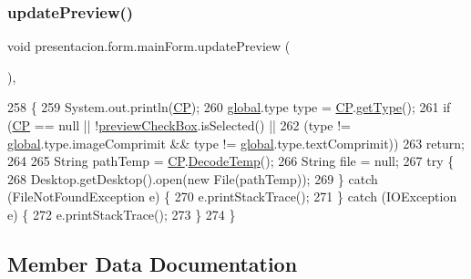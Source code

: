 \subsubsection{\texorpdfstring{update\+Preview()}{updatePreview()}}
{\footnotesize\ttfamily void presentacion.\+form.\+main\+Form.\+update\+Preview (\begin{DoxyParamCaption}{ }\end{DoxyParamCaption})\hspace{0.3cm}{\ttfamily [inline]}, {\ttfamily [private]}}


\begin{DoxyCode}
258                                  \{
259         System.out.println(\hyperlink{classpresentacion_1_1form_1_1mainForm_a4d01396f002d4f9bd18db3877057c77b}{CP});
260         \hyperlink{namespaceglobal}{global}.type type = \hyperlink{classpresentacion_1_1form_1_1mainForm_a4d01396f002d4f9bd18db3877057c77b}{CP}.\hyperlink{classpresentacion_1_1Ctrl__Presentacio_1_1Ctrl__Presentacio_a029db5d77bf1e81be0811816a74d81a0}{getType}();
261         \textcolor{keywordflow}{if} (\hyperlink{classpresentacion_1_1form_1_1mainForm_a4d01396f002d4f9bd18db3877057c77b}{CP} == null || !\hyperlink{classpresentacion_1_1form_1_1mainForm_a0dbe9873e69c0702a519d1cd171594c0}{previewCheckBox}.isSelected() ||
262                 (type != \hyperlink{namespaceglobal}{global}.type.imageComprimit && type != \hyperlink{namespaceglobal}{global}.type.textComprimit))
263             \textcolor{keywordflow}{return};
264 
265         String pathTemp = \hyperlink{classpresentacion_1_1form_1_1mainForm_a4d01396f002d4f9bd18db3877057c77b}{CP}.\hyperlink{classpresentacion_1_1Ctrl__Presentacio_1_1Ctrl__Presentacio_aa9c12bc59a7e9fa0ccd09c0e007d4a4c}{DecodeTemp}();
266         String file = null;
267         \textcolor{keywordflow}{try} \{
268             Desktop.getDesktop().open(\textcolor{keyword}{new} File(pathTemp));
269         \} \textcolor{keywordflow}{catch} (FileNotFoundException e) \{
270             e.printStackTrace();
271         \} \textcolor{keywordflow}{catch} (IOException e) \{
272             e.printStackTrace();
273         \}
274     \}
\end{DoxyCode}


\subsection{Member Data Documentation}
\mbox{\label{classpresentacion_1_1form_1_1mainForm_a957286f19a01eedc946c0f666636fb21}} 
